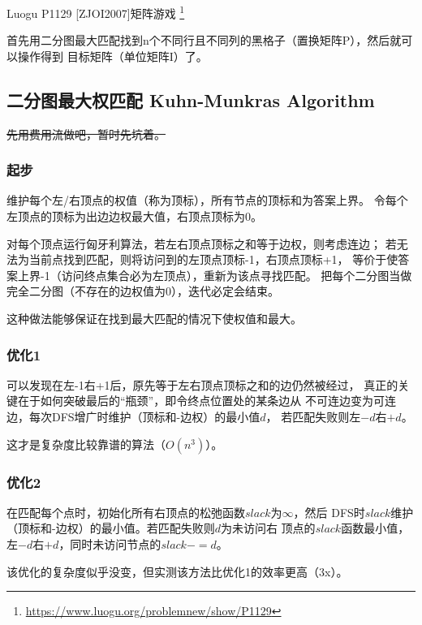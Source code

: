 Luogu P1129 [ZJOI2007]矩阵游戏
\footnote{\url{https://www.luogu.org/problemnew/show/P1129}}

首先用二分图最大匹配找到n个不同行且不同列的黑格子（置换矩阵P），然后就可以操作得到
目标矩阵（单位矩阵I）了。



\subsection{二分图最大权匹配 Kuhn-Munkras Algorithm}
\sout{先用费用流做吧，暂时先坑着。}
\subsubsection{起步}
维护每个左/右顶点的权值（称为顶标），所有节点的顶标和为答案上界。
令每个左顶点的顶标为出边边权最大值，右顶点顶标为0。

对每个顶点运行匈牙利算法，若左右顶点顶标之和等于边权，则考虑连边；
若无法为当前点找到匹配，则将访问到的左顶点顶标-1，右顶点顶标+1，
等价于使答案上界-1（访问终点集合必为左顶点），重新为该点寻找匹配。
把每个二分图当做完全二分图（不存在的边权值为0），迭代必定会结束。

这种做法能够保证在找到最大匹配的情况下使权值和最大。
\subsubsection{优化1}
可以发现在左-1右+1后，原先等于左右顶点顶标之和的边仍然被经过，
真正的关键在于如何突破最后的``瓶颈''，即令终点位置处的某条边从
不可连边变为可连边，每次DFS增广时维护（顶标和-边权）的最小值$d$，
若匹配失败则左$-d$右$+d$。

这才是复杂度比较靠谱的算法（$O(n^3)$）。
\subsubsection{优化2}
在匹配每个点时，初始化所有右顶点的松弛函数$slack$为$\infty$，然后
DFS时$slack$维护（顶标和-边权）的最小值。若匹配失败则$d$为未访问右
顶点的$slack$函数最小值，左$-d$右$+d$，同时未访问节点的$slack-=d$。

该优化的复杂度似乎没变，但实测该方法比优化1的效率更高（3x）。
